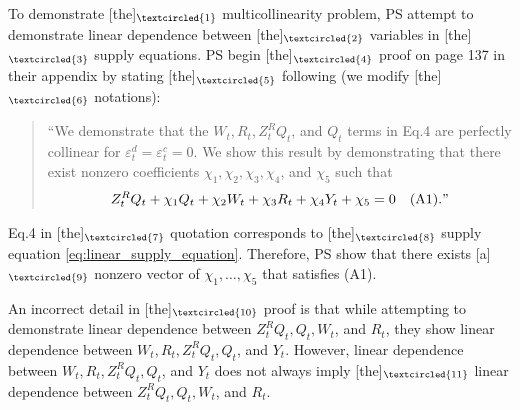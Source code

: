 \documentclass[11pt, a4paper]{article}
\begin{document}
To demonstrate [the]$_{\textcircled{1}}$ multicollinearity problem, PS attempt to demonstrate linear dependence between [the]$_{\textcircled{2}}$ variables in [the]$_{\textcircled{3}}$ supply equations. 
PS begin [the]$_{\textcircled{4}}$ proof on page 137 in their appendix by stating [the]$_{\textcircled{5}}$ following (we modify [the]$_{\textcircled{6}}$ notations):
\begin{quote}
    ``We demonstrate that the $W_{t}, R_{t}, Z^{R}_{t}Q_{t}$, and $Q_{t}$ terms in Eq.4 are perfectly collinear for $\varepsilon_{t}^{d} = \varepsilon_{t}^{c} = 0$. We show this result by demonstrating that there exist nonzero coefficients $\chi_1,\chi_2,\chi_3,\chi_4$, and $\chi_5$ such that 
   \begin{align*}
    Z^{R}_{t} Q_{t} + \chi_1 Q_{t} + \chi_2 W_{t} + \chi_3 R_{t} + \chi_4 Y_{t} + \chi_5 = 0 \quad (\text{A1})."
    \end{align*}
\end{quote}
Eq.4 in [the]$_{\textcircled{7}}$ quotation corresponds to [the]$_{\textcircled{8}}$ supply equation \eqref{eq:linear_supply_equation}.
Therefore, PS show that there exists [a]$_{\textcircled{9}}$ nonzero vector of $\chi_1, \ldots, \chi_5$ that satisfies (A1).

An incorrect detail in [the]$_{\textcircled{10}}$ proof is that while attempting to demonstrate linear dependence between $Z^{R}_{t}Q_{t}, Q_{t}, W_{t}$, and $R_{t}$, they show linear dependence between $W_{t}, R_{t}, Z^{R}_{t}Q_{t}, Q_{t}$, and $Y_t$. 
However, linear dependence between $W_{t}, R_{t}, Z^{R}_{t}Q_{t}, Q_{t}$, and $Y_t$ does not always imply [the]$_{\textcircled{11}}$ linear dependence between $Z^{R}_{t}Q_{t}, Q_{t}, W_{t}$, and $R_{t}$.
\end{document}
